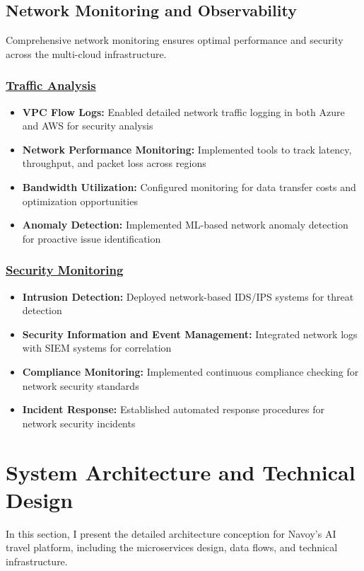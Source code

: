 \subsection{Network Monitoring and Observability}
Comprehensive network monitoring ensures optimal performance and security across the multi-cloud infrastructure.

\subsubsection*{\underline{Traffic Analysis}}
\begin{itemize}
    \item \textbf{VPC Flow Logs:} Enabled detailed network traffic logging in both Azure and AWS for security analysis
    \item \textbf{Network Performance Monitoring:} Implemented tools to track latency, throughput, and packet loss across regions
    \item \textbf{Bandwidth Utilization:} Configured monitoring for data transfer costs and optimization opportunities
    \item \textbf{Anomaly Detection:} Implemented ML-based network anomaly detection for proactive issue identification
\end{itemize}

\subsubsection*{\underline{Security Monitoring}}
\begin{itemize}
    \item \textbf{Intrusion Detection:} Deployed network-based IDS/IPS systems for threat detection
    \item \textbf{Security Information and Event Management:} Integrated network logs with SIEM systems for correlation
    \item \textbf{Compliance Monitoring:} Implemented continuous compliance checking for network security standards
    \item \textbf{Incident Response:} Established automated response procedures for network security incidents
\end{itemize}

\section{System Architecture and Technical Design}
In this section, I present the detailed architecture conception for Navoy's AI travel platform, including the microservices design, data flows, and technical infrastructure.

